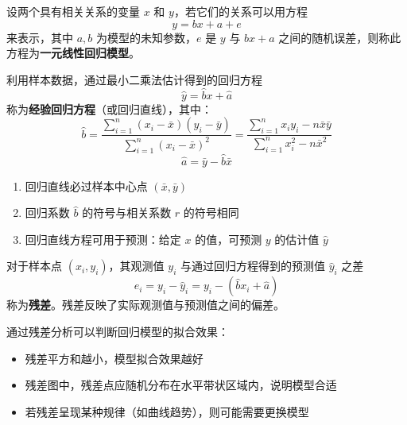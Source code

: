 \documentclass[11pt]{ctexrep}
\begin{document}
\begin{definition}[一元线性回归模型]
    设两个具有相关关系的变量 $x$ 和 $y$，若它们的关系可以用方程
    \[
        y = bx + a + e
    \]
    来表示，其中 $a, b$ 为模型的未知参数，$e$ 是 $y$ 与 $bx + a$ 之间的随机误差，则称此方程为\textbf{一元线性回归模型}。
\end{definition}

\begin{definition}[经验回归方程]
    利用样本数据，通过最小二乘法估计得到的回归方程
    \[
        \hat{y} = \hat{b}x + \hat{a}
    \]
    称为\textbf{经验回归方程}（或回归直线），其中：
    \[
        \hat{b} = \frac{\sum_{i=1}^{n}(x_i - \bar{x})(y_i - \bar{y})}{\sum_{i=1}^{n}(x_i - \bar{x})^2} = \frac{\sum_{i=1}^{n}x_i y_i - n\bar{x}\bar{y}}{\sum_{i=1}^{n}x_i^2 - n\bar{x}^2}
    \]
    \[
        \hat{a} = \bar{y} - \hat{b}\bar{x}
    \]
\end{definition}

\begin{property}[回归直线的性质]
    \begin{enumerate}
        \item 回归直线必过样本中心点 $(\bar{x}, \bar{y})$
        \item 回归系数 $\hat{b}$ 的符号与相关系数 $r$ 的符号相同
        \item 回归直线方程可用于预测：给定 $x$ 的值，可预测 $y$ 的估计值 $\hat{y}$
    \end{enumerate}
\end{property}

\begin{definition}[残差]
    对于样本点 $(x_i, y_i)$，其观测值 $y_i$ 与通过回归方程得到的预测值 $\hat{y}_i$ 之差
    \[
        e_i = y_i - \hat{y}_i = y_i - (\hat{b}x_i + \hat{a})
    \]
    称为\textbf{残差}。残差反映了实际观测值与预测值之间的偏差。
\end{definition}

\begin{property}[残差分析]
    通过残差分析可以判断回归模型的拟合效果：
    \begin{itemize}
        \item 残差平方和越小，模型拟合效果越好
        \item 残差图中，残差点应随机分布在水平带状区域内，说明模型合适
        \item 若残差呈现某种规律（如曲线趋势），则可能需要更换模型
    \end{itemize}
\end{property}
\end{document}
